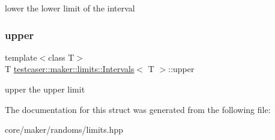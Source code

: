 lower the lower limit of the interval 

\mbox{\label{structtestcaser_1_1maker_1_1limits_1_1Intervals_ae8f8bf8607c83b429729bd36e74699dd}} 
\subsubsection{\texorpdfstring{upper}{upper}}
{\footnotesize\ttfamily template$<$class T$>$ \\
T \mbox{\hyperlink{structtestcaser_1_1maker_1_1limits_1_1Intervals}{testcaser\+::maker\+::limits\+::\+Intervals}}$<$ T $>$\+::upper}



upper the upper limit 



The documentation for this struct was generated from the following file\+:\begin{DoxyCompactItemize}
\item 
core/maker/randoms/limits.\+hpp\end{DoxyCompactItemize}
